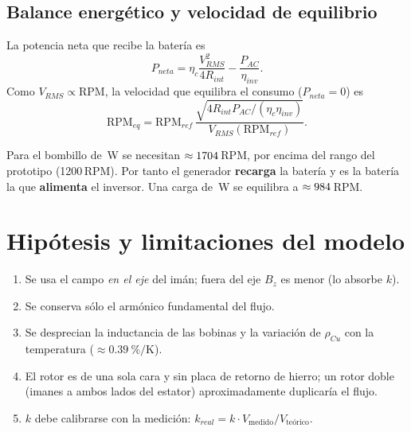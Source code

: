 \documentclass[11pt]{article}
\begin{document}
\subsection{Balance energético y velocidad de equilibrio}
La potencia neta que recibe la batería es
\begin{equation}
  P_{neta}=\eta_c\frac{V_{RMS}^2}{4R_{int}}-\frac{P_{AC}}{\eta_{inv}}.
\end{equation}
Como $V_{RMS}\propto\text{RPM}$, la velocidad que equilibra el consumo ($P_{neta}=0$) es
\begin{equation}
  \text{RPM}_{eq}=\text{RPM}_{ref}\,\frac{\sqrt{4R_{int}P_{AC}/(\eta_c\eta_{inv})}}{V_{RMS}(\text{RPM}_{ref})}.
\end{equation}
\begin{resultado}
Para el bombillo de \ValPotenciaCargaAc\,W se necesitan $\approx1704$\,RPM, por encima del rango
del prototipo (1200\,RPM). Por tanto el generador \textbf{recarga} la batería y es la batería la que
\textbf{alimenta} el inversor. Una carga de \ValPotenciaCargaReducida\,W se equilibra a
$\approx984$\,RPM.
\end{resultado}

\section{Hipótesis y limitaciones del modelo}
\begin{enumerate}
  \item Se usa el campo \emph{en el eje} del imán; fuera del eje $B_z$ es menor (lo absorbe $k$).
  \item Se conserva sólo el armónico fundamental del flujo.
  \item Se desprecian la inductancia de las bobinas y la variación de $\rho_{Cu}$ con la temperatura
        ($\approx\SI{0.39}{\percent\per\kelvin}$).
  \item El rotor es de una sola cara y sin placa de retorno de hierro; un rotor doble (imanes a ambos lados del
        estator) aproximadamente duplicaría el flujo.
  \item $k$ debe calibrarse con la medición: $k_{real}=k\cdot V_{\text{medido}}/V_{\text{teórico}}$.
\end{enumerate}

\end{document}
